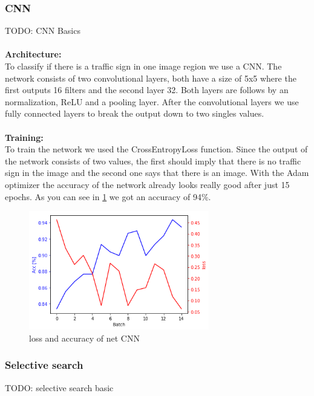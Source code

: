 \documentclass[12pt,a4paper,bibliography=totocnumbered,listof=totocnumbered]{scrartcl}
\begin{document}
\subsubsection{CNN}

TODO: CNN Basics\\\\

\textbf{Architecture:}\\
To classify if there is a traffic sign in one image region we use a CNN. The network consists of two convolutional layers, both have a size of 5x5 where the first outputs 16 filters and the second layer 32. Both layers are follows by an normalization, ReLU and a pooling layer. After the convolutional layers we use fully connected layers to break the output down to two singles values.\\\\

\textbf{Training:}\\
To train the network we used the CrossEntropyLoss function. Since the output of the network consists of two values, the first should imply that there is no traffic sign in the image and the second one says that there is an image. With the Adam optimizer the accuracy of the network already looks really good after just 15 epochs. As you can see in \ref{fig:loss_acc} we got an accuracy of 94\%.

\begin{figure}[htbp] 
  \centering
     \includegraphics[width=0.7\textwidth]{loss_acc}
  \caption{loss and accuracy of net CNN}
  \label{fig:loss_acc}
\end{figure}

\subsubsection{Selective search}

TODO: selective search basic\\\\
\end{document}
